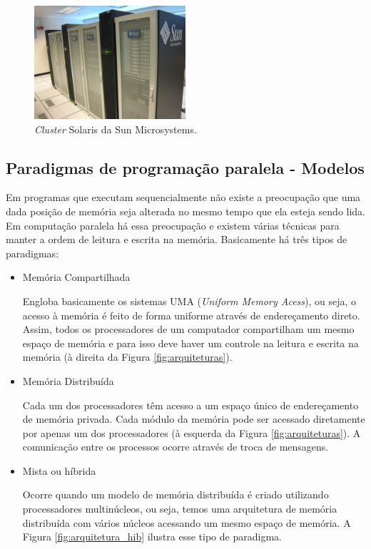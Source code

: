 \begin{itemize}
\begin{figure}[htbp]
	\centering
	\includegraphics[width=0.5\textwidth]{fig/computer_cluster.jpg}
	\caption{\textit{Cluster} Solaris da Sun Microsystems.} 
	\label{fig:computer_cluster}
\end{figure}

\end{itemize}

\subsection{Paradigmas de programação paralela - Modelos}

Em programas que executam sequencialmente não existe a preocupação que uma dada posição de memória seja alterada no mesmo tempo que ela esteja sendo lida. Em computação paralela há essa preocupação e existem várias técnicas para manter a ordem de leitura e escrita na memória. Basicamente há três tipos de paradigmas:

\begin{itemize}
	\item Memória Compartilhada
	
	Engloba basicamente os sistemas UMA (\textit{Uniform Memory Acess}), ou seja, o acesso à memória é feito de forma uniforme através de endereçamento direto. Assim, todos os processadores de um computador compartilham um mesmo espaço de memória e para isso deve haver um controle na leitura e escrita na memória (à direita da Figura \ref{fig:arquiteturas}).
	
	\item Memória Distribuída
	
	Cada um dos processadores têm acesso a um espaço único de endereçamento de memória privada. Cada módulo da memória pode ser acessado diretamente por apenas um dos processadores (à esquerda da Figura \ref{fig:arquiteturas}). A comunicação entre os processos ocorre através de troca de mensagens.   
	
	\item Mista ou híbrida
	
	Ocorre quando um modelo de memória distribuída é criado utilizando processadores multinúcleos, ou seja, temos uma arquitetura de memória distribuída com vários núcleos acessando um mesmo espaço de memória. A Figura \ref{fig:arquitetura_hib} ilustra esse tipo de paradigma.
	
\end{itemize}

